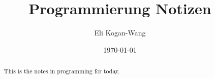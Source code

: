 \documentclass[a4paper,12pt]{article}
\title{Programmierung Notizen}
\author{Eli Kogan-Wang}
\date{\today}
\begin{document}
\renewcommand{\abstractname}{Abstract}

\begin{abstract}
  This is the notes in programming for today.
\end{abstract}
\end{document}
